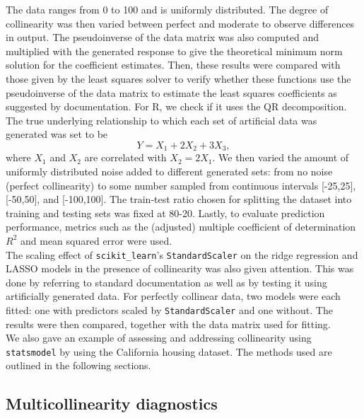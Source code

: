 \documentclass[12pt]{article}
\begin{document}
	The data ranges from 0 to 100 and is uniformly distributed. The degree of collinearity was then varied between perfect and moderate to observe differences in output. The pseudoinverse of the data matrix was also computed and multiplied with the generated response to give the theoretical minimum norm solution for the coefficient estimates. Then, these results were compared with those given by the least squares solver to verify whether these functions use the pseudoinverse of the data matrix to estimate the least squares coefficients as suggested by documentation. For R, we check if it uses the QR decomposition.\\
	
	The true underlying relationship to which each set of artificial data was generated was set to be 
	\begin{equation}
		Y=X_1+2X_2+3X_3,
	\end{equation}
	where $X_1$ and $X_2$ are correlated with $X_2=2X_1$. We then varied the amount of uniformly distributed noise added to different generated sets: from no noise (perfect collinearity) to some number sampled from continuous intervals [-25,25], [-50,50], and [-100,100]. The train-test ratio chosen for splitting the dataset into training and testing sets was fixed at 80-20. Lastly, to evaluate prediction performance, metrics such as the (adjusted) multiple coefficient of determination $R^2$ and mean squared error were used.\\
	
	The scaling effect of \texttt{scikit\_learn}'s \texttt{StandardScaler} on the ridge regression and LASSO models in the presence of collinearity was also given attention. This was done by referring to standard documentation as well as by testing it using artificially generated data. For perfectly collinear data, two models were each fitted: one with predictors scaled by \texttt{StandardScaler} and one without. The results were then compared, together with the data matrix used for fitting. \\
	
	We also gave an example of assessing and addressing collinearity using \texttt{statsmodel} by using the California housing dataset. The methods used are outlined in the following sections.
	
	\subsection{Multicollinearity diagnostics\label{sec:3.1}}
	
\end{document}
